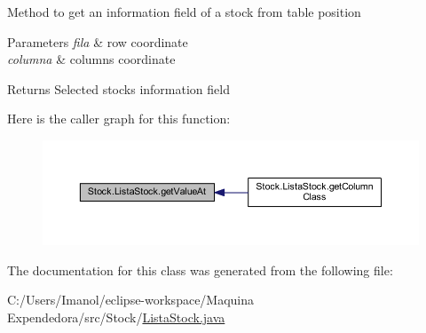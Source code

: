 Method to get an information field of a stock from table position 
\begin{DoxyParams}{Parameters}
{\em fila} & row coordinate \\
\hline
{\em columna} & columns coordinate \\
\hline
\end{DoxyParams}
\begin{DoxyReturn}{Returns}
Selected stock\textquotesingle{}s information field 
\end{DoxyReturn}
Here is the caller graph for this function\+:
\nopagebreak
\begin{figure}[H]
\begin{center}
\leavevmode
\includegraphics[width=350pt]{class_stock_1_1_lista_stock_ac181755caf0025ec10ae230927bb457f_icgraph}
\end{center}
\end{figure}


The documentation for this class was generated from the following file\+:\begin{DoxyCompactItemize}
\item 
C\+:/\+Users/\+Imanol/eclipse-\/workspace/\+Maquina Expendedora/src/\+Stock/\mbox{\hyperlink{_lista_stock_8java}{Lista\+Stock.\+java}}\end{DoxyCompactItemize}
